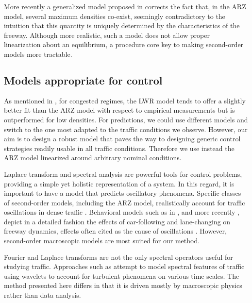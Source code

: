\documentclass[preprint]{elsarticle}
\begin{document}

More recently a generalized model proposed in \cite{Fan} corrects the fact that, in the ARZ model, several maximum densities co-exist, seemingly contradictory to the intuition that this quantity is uniquely determined by the characteristics of the freeway. Although more realistic, such a model does not allow proper linearization about an equilibrium, a procedure core key to making second-order models more tractable.

\subsection{Models appropriate for control}
As mentioned in \cite{Fan}, for congested regimes, the LWR model tends to offer a slightly better fit than the ARZ model with respect to empirical measurements but is outperformed for low densities. For predictions, we could use different models and switch to the one most adapted to the traffic conditions we observe. However, our aim is to design a robust model that paves the way to designing generic control strategies readily usable in all traffic conditions. Therefore we use instead the ARZ model linearized around arbitrary nominal conditions. 

Laplace transform and spectral analysis are powerful tools for control problems, providing a simple yet holistic representation of a system. In this regard, it is important to have a model that predicts oscillatory phenomena. Specific classes of second-order models, including the ARZ model, realistically account for traffic oscillations in dense traffic \cite{Greenberg_congestionredux}. Behavioral models such as in \cite{Newell}, and more recently \cite{Chen2012}, depict in a detailed fashion the effects of car-following
and lane-changing on freeway dynamics, effects often cited as the cause of oscillations \cite{Mauch02freewaytraffic, lanechangin2005,lanechanging2007}. However, second-order macroscopic models are most suited for our method. 

Fourier and Laplace transforms are not the only spectral operators useful for studying traffic. Approaches such as \cite{Zheng2011} attempt to model spectral features of traffic using wavelets to account for turbulent phenomena on various time scales. The method presented here differs in that it is driven mostly by macroscopic physics rather than data analysis.
\end{document}
